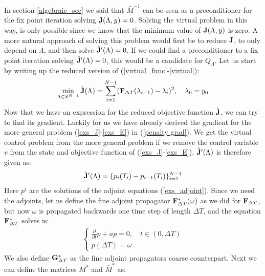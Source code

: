In section \ref{algebraic_sec} we said that $\bar M^{-1}$ can be seen as a preconditioner for the fix point iteration solving $\bold{J}(\Lambda,y)=0$. Solving the virtual problem in this way, is only possible since we know that the minimum value of $\bold{J}(\Lambda,y)$ is zero. A more natural approach of solving this problem would first be to reduce $\bold J$, to only depend on $\Lambda$, and then solve $\hat {\bold J}'(\Lambda)=0$. If we could find a preconditioner to a fix point iteration solving $\hat{ \bold J} '(\Lambda)=0$, this would be a candidate for $Q_{\Lambda}$. Let us start by writing up the reduced version of (\ref{virtual_func}-\ref{virtual}):
\begin{align}
\min_{\Lambda\in\mathbb{R}^{N-1}}\hat {\bold J}(\Lambda) = \sum_{i=1}^{N-1} (\bold F_{\Delta T}(\lambda_{i-1})-\lambda_{i})^2,\quad \lambda_0=y_0 \label{reduced_viritual}
\end{align} 
Now that we have an expression for the reduced objective function $\hat {\bold J}$, we can try to find its gradient. Luckily for us we have already derived the gradient for the more general problem (\ref{exs_J}-\ref{exs_E}) in (\ref{penalty grad}). We get the virtual control problem from the more general problem if we remove the control variable $v$ from the state and objective function of (\ref{exs_J}-\ref{exs_E}). $\hat {\bold J}'(\Lambda)$ is therefore given as:
\begin{align*}
\hat{\bold J}'(\Lambda) = \{p_i(T_i)-p_{i-1}(T_i)\}_{i=1}^{N-1}
\end{align*}
Here $p^i$ are the solutions of the adjoint equations (\ref{exs_adjoint}). Since we need the adjoints, let us define the fine adjoint propagator $\bold{F}_{\Delta T}^*(\omega)$ as we did for $\bold{F}_{\Delta T}$, but now $\omega$ is propagated backwards one time step of length $\Delta T$, and the equation $\bold{F}_{\Delta T}^*$ solves is:   
\begin{align}
\left\{
     \begin{array}{lr}
	\frac{\partial }{\partial t}p +ap=0,\quad t\in (0,\Delta T)  \\
	p(\Delta T) = \omega
	\end{array}
   \right. \label{virtual_adjoint_exs}
\end{align}
We also define $\bold G_{\Delta T}^*$ as the fine adjoint propagators coarse counterpart. Next we can define the matrices $M^*$ and $\bar M^*$ as:
